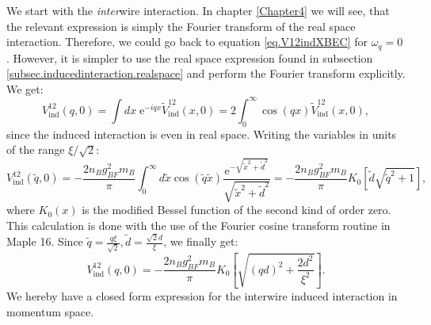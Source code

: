 We start with the \textit{inter}wire interaction. In chapter \ref{Chapter4} we will see, that the relevant expression is simply the Fourier transform of the real space interaction. Therefore, we could go back to equation \eqref{eq.V12indXBEC} for $\omega_q = 0$. However, it is simpler to use the real space expression found in subsection \ref{subsec.inducedinteraction.realspace} and perform the Fourier transform explicitly. We get:
\begin{equation}
V_{\text{ind}}^{12}(q,0) = \int dx \; \text{e}^{-iqx}\tilde{V}_{\text{ind}}^{12}(x,0) = 2\int_0^\infty \cos(qx)\tilde{V}_{\text{ind}}^{12}(x,0), \nonumber
\end{equation}
since the induced interaction is even in real space. Writing the variables in units of the range $\xi/\sqrt{2}$:
\begin{equation}
V_{\text{ind}}^{12}(\tilde{q},0) = -\frac{2n_Bg^2_{BF}m_B}{\pi}\int_0^\infty d\tilde{x} \cos(\tilde{q}\tilde{x})\frac{ \text{e}^{ -\sqrt{\tilde{x}^2+\tilde{d}^2} } }{\sqrt{\tilde{x}^2+\tilde{d}^2}} = -\frac{2n_Bg^2_{BF}m_B}{\pi}K_0\left[\tilde{d}\sqrt{\tilde{q}^2+1}\right], \nonumber
\end{equation}
where $K_0(x)$ is the modified Bessel function of the second kind of order zero. This calculation is done with the use of the Fourier cosine transform routine in Maple 16. Since $\tilde{q} = \frac{q\xi}{\sqrt{2}}, \tilde{d} = \frac{\sqrt{2}d}{\xi}$, we finally get:
 \begin{equation}
V_{\text{ind}}^{12}(q,0) = -\frac{2n_Bg^2_{BF}m_B}{\pi}K_0\left[\sqrt{(qd)^2+\frac{2d^2}{\xi^2}}\right]. 
\label{eq.V12indq.zerofrequency}
\end{equation}
We hereby have a closed form expression for the interwire induced interaction in momentum space. 

